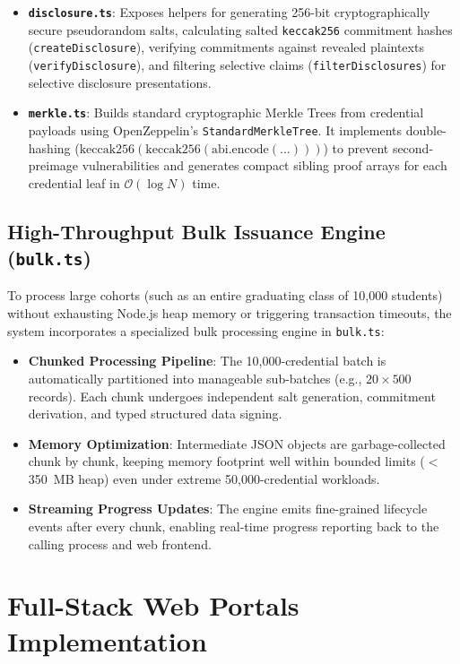 \begin{itemize}
    \item \textbf{\texttt{disclosure.ts}}: Exposes helpers for generating 256-bit cryptographically secure pseudorandom salts, calculating salted \texttt{keccak256} commitment hashes (\texttt{createDisclosure}), verifying commitments against revealed plaintexts (\texttt{verifyDisclosure}), and filtering selective claims (\texttt{filterDisclosures}) for selective disclosure presentations.
    \item \textbf{\texttt{merkle.ts}}: Builds standard cryptographic Merkle Trees from credential payloads using OpenZeppelin's \texttt{StandardMerkleTree}. It implements double-hashing ($\text{keccak256}(\text{keccak256}(\text{abi.encode}(\dots)))$) to prevent second-preimage vulnerabilities and generates compact sibling proof arrays for each credential leaf in $\mathcal{O}(\log N)$ time.
\end{itemize}

\subsection{High-Throughput Bulk Issuance Engine (\texttt{bulk.ts})}

To process large cohorts (such as an entire graduating class of 10,000 students) without exhausting Node.js heap memory or triggering transaction timeouts, the system incorporates a specialized bulk processing engine in \texttt{bulk.ts}:

\begin{itemize}
    \item \textbf{Chunked Processing Pipeline}: The 10,000-credential batch is automatically partitioned into manageable sub-batches (e.g., $20 \times 500$ records). Each chunk undergoes independent salt generation, commitment derivation, and typed structured data signing.
    \item \textbf{Memory Optimization}: Intermediate JSON objects are garbage-collected chunk by chunk, keeping memory footprint well within bounded limits ($<$350~MB heap) even under extreme 50,000-credential workloads.
    \item \textbf{Streaming Progress Updates}: The engine emits fine-grained lifecycle events after every chunk, enabling real-time progress reporting back to the calling process and web frontend.
\end{itemize}

\section{Full-Stack Web Portals Implementation}

